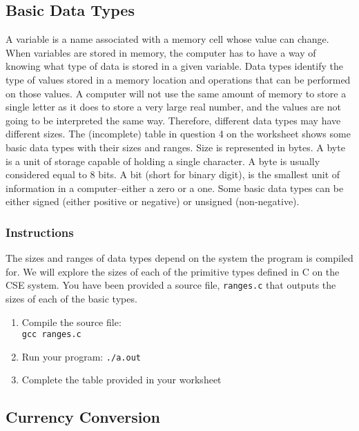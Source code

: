 \documentclass[12pt]{scrartcl}
\begin{document}
\subsection{Basic Data Types}

A variable is a name associated with a memory cell whose value can change. 
When variables are stored in memory, the computer has to have a way of 
knowing what type of data is stored in a given variable.  Data types identify 
the type of values stored in a memory location and operations that can be 
performed on those values.  A computer will not use the same amount of 
memory to store a single letter as it does to store a very large real number, 
and the values are not going to be interpreted the same way.  Therefore, 
different data types may have different sizes. The (incomplete) table in 
question 4 on the worksheet shows some basic data types with their 
sizes and ranges.  Size is represented in bytes.  A byte is a unit of storage 
capable of holding a single character.  A byte is usually considered equal 
to 8 bits.  A bit (short for binary digit), is the smallest unit of information in 
a computer--either a zero or a one.  Some basic data types can be either 
signed (either positive or negative) or unsigned (non-negative).

\subsubsection*{Instructions}

The sizes and ranges of data types depend on the system the program is 
compiled for.  We will explore the sizes of each of the primitive types defined 
in C on the CSE system.  You have been provided a source file, 
\texttt{ranges.c} that outputs the sizes of each of the basic types.

\begin{enumerate}
  \item Compile the source file:\\
  	\texttt{gcc ranges.c}
  \item Run your program:
  	\texttt{./a.out}
  \item Complete the table provided in your worksheet
 \end{enumerate}
 
\subsection{Currency Conversion}
\end{document}

